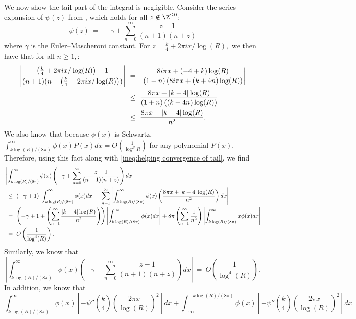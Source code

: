 \documentclass[11pt, reqno]{amsart}
\makeatletter
\renewenvironment{proof}[1][\proofname]{\par
  \vspace{-.7\topsep}%
  \pushQED{\qed}%
  \normalfont
  \topsep0pt \partopsep0pt %
  \trivlist
  \item[\hskip\labelsep
        \itshape
    #1\@addpunct{.}]\ignorespaces
}{%
  \popQED\endtrivlist\@endpefalse
  \addvspace{6pt plus 6pt} %
}
\theoremstyle{definition}
\theoremstyle{remark}
\numberwithin{equation}{section}
\makeatother
\begin{document}
\begin{proof}
We now show the tail part of the integral is negligible. Consider the series expansion of $\psi(z)$ from \cite{abramowitz1972handbook}, which holds for all $z \notin \Z^{\leq 0}$:
\begin{equation}
\psi(z) \ = \ -\gamma + \sum_{n=0}^\infty \frac{z-1}{(n+1)(n+z)}
\end{equation}
where $\gamma$ is the Euler–Mascheroni constant. For $z = \frac{k}{4}+2\pi i x/ \log(R),$ we then have that for all $n \geq 1,$:
\begin{align}\label{ineq:helping convergence of tail}
  \left|  \frac{\left(\frac{k}{4}+2\pi i x/ \log(R)\right)-1}{(n+1)(n+\left(\frac{k}{4}+2\pi i x/ \log(R)\right))}\right| & \ = \ \left|\frac{8 i \pi x + (-4 + k) \log(R)}{(1 + n)\left(8 i \pi x + (k + 4n) \log(R)\right)}\right| \notag \\
  & \ \leq \ \frac{8\pi x + |k-4| \log(R)}{(1 + n)\left((k + 4n) \log(R)\right)} \notag \\
  & \ \leq \ \frac{8\pi x+|k-4|\log(R)}{n^2}.
\end{align} 
We also know that because $\phi(x)$ is Schwartz, $\int_{k\log(R)/(8\pi)}^\infty \phi(x) P(x)dx = O\left(\frac{1}{\log^B R}\right)$ for any polynomial $P(x)$. 
Therefore, using this fact along with \eqref{ineq:helping convergence of tail}, we find 
\begin{align}\label{eq: remainder part 1/R} &\left|\int_{k\log(R)/(8\pi)}^\infty  \phi(x)\left(-\gamma + \sum_{n=0}^\infty \frac{z-1}{(n+1)(n+z)}\right) dx \right|\notag\\
   & \ \leq \ (-\gamma +1)\left|\int_{k\log(R)/(8\pi)}^\infty  \phi(x)dx \right|+  \sum_{n=1}^\infty\left|\int_{k\log(R)/(8\pi)}^\infty\phi(x)\left(\frac{8\pi x+|k-4|\log(R)}{n^2}\right)dx \right| \notag\\
   & \ = \ \left(-\gamma +1+ \left(\sum_{n=1}^\infty \frac{|k-4|\log(R)}{n^2}\right)\right)\left|\int_{k\log(R)/(8\pi)}^\infty  \phi(x)dx\right| +  8\pi \left(\sum_{n=1}^\infty \frac{1}{n^2}\right)\left|\int_{k\log(R)/(8\pi)}^\infty  x\phi(x)dx\right|
   \notag \\
   & \ = \ O\left(\frac{1}{\log^4(R)}\right).
\end{align} Similarly, we know that $$\left|\int_{k\log(R)/(8\pi)}^\infty  \phi(x)\left(-\gamma + \sum_{n=0}^\infty \frac{z-1}{(n+1)(n+z)}\right) dx \right| \ = \ O\left(\frac{1}{\log^4(R)}\right).$$ 
In addition, we know that \begin{equation} \label{eq: other piece of remainder}
    \int_{k\log(R)/(8\pi)}^{\infty} \phi(x)\left[-\psi''\left(\frac{k}{4}\right)\left(\frac{2\pi x}{\log(R)}\right)^2\right]dx + \int_{-\infty}^{-k\log(R)/(8\pi)} \phi(x)\left[-\psi''\left(\frac{k}{4}\right)\left(\frac{2\pi x}{\log(R)}\right)^2\right]dx

\end{equation}
\end{proof}
\end{document}
